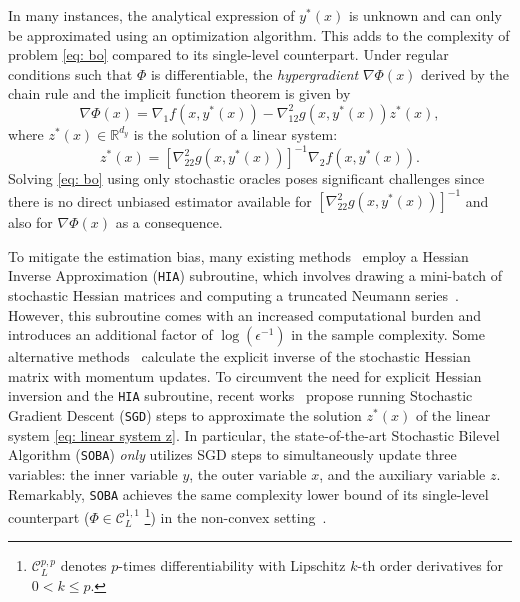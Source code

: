 \documentclass[10pt]{article}
\theoremstyle{remark}
\newcommand{\cC}{\mathcal{C}}
\newcommand{\realset}{\mathbb{R}}
\begin{document}
 In many instances, the analytical expression of $y^*(x)$ is unknown and can only be approximated using an optimization algorithm. This adds to the complexity of problem \eqref{eq: bo} compared to its single-level counterpart. Under regular conditions such that $\Phi$ is differentiable, the \emph{hypergradient} $\nabla \Phi(x)$ derived by the chain rule and the implicit function theorem is given by
 \begin{equation}\label{eq: hypergradient nabla F}
     \nabla \Phi(x) = \nabla_1 f(x, y^*(x)) - \nabla_{12}^2 g(x, y^*(x)) z^*(x),
 \end{equation}
 where $z^*(x)\in\realset^{d_y}$ is the solution of a linear system:
 \begin{equation}\label{eq: linear system z}
     z^*(x) = \left[\nabla_{22}^{2}g(x,y^*(x))\right]^{-1}\nabla_2 f(x, y^*(x)).
 \end{equation}
Solving \eqref{eq: bo} using only stochastic oracles poses significant challenges since there is no direct unbiased estimator available for $\left[\nabla_{22}^{2}g(x,y^*(x))\right]^{-1}$ and also for $\nabla \Phi(x)$ as a consequence.

To mitigate the estimation bias, many existing methods~\cite{ghadimi2018approximation, ji2021bilevel, yang2021provably, hong2023two, guo2021novel, khanduri2021near, chen2021closing, akhtar2022projection} employ a Hessian Inverse Approximation (\texttt{HIA}) subroutine, which involves drawing a mini-batch of stochastic Hessian matrices and computing a truncated Neumann series~\cite{stewart1998matrix}. However, this subroutine comes with an increased computational burden and introduces an additional factor of $\log(\epsilon^{-1})$ in the sample complexity. Some alternative methods~\cite{chen2022single, guo2021randomized, li2022fully} calculate the explicit inverse of the stochastic Hessian matrix with momentum updates. To circumvent the need for explicit Hessian inversion and the \texttt{HIA} subroutine, recent works~\cite{arbel2022amortized, dagreou2022framework} propose running Stochastic Gradient Descent (\texttt{SGD}) steps to approximate the solution $z^*(x)$ of the linear system \eqref{eq: linear system z}. In particular, the state-of-the-art Stochastic Bilevel Algorithm (\texttt{SOBA}) \emph{only} utilizes SGD steps to simultaneously update three variables: the inner variable $y$, the outer variable $x$, and the auxiliary variable $z$. Remarkably, \texttt{SOBA} achieves the same complexity lower bound of its single-level counterpart ($\Phi \in \cC_{L}^{1,1}$ \footnote[9]{\label{footnote: Smoothness} $\cC_{L}^{p,p}$ denotes $p$-times differentiability with Lipschitz $k$-th order derivatives for $0<k\leq p$.}) in the non-convex setting~\cite{arjevani2023lower}. 
\end{document}
